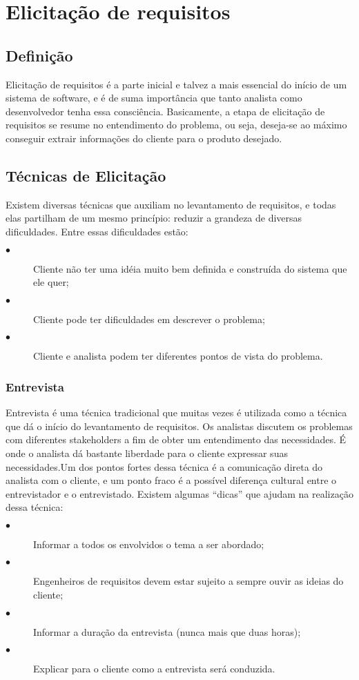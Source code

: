\chapter{Elicitação de requisitos}

\section{Definição}
  Elicitação de requisitos é a parte inicial e talvez a mais essencial do início de um sistema de software, e é de suma importância que tanto analista como desenvolvedor tenha essa consciência. Basicamente, a etapa de elicitação de requisitos se resume no entendimento do problema, ou seja, deseja-se ao máximo conseguir extrair informações do cliente para o produto desejado.
 \section{Técnicas de Elicitação}
 Existem diversas técnicas que auxiliam no levantamento de requisitos, e todas elas partilham de um mesmo princípio: reduzir a grandeza de diversas dificuldades. Entre essas dificuldades estão:
\begin{description}
\item[$\bullet$] Cliente não ter uma idéia muito bem definida e construída do sistema que ele quer;
\item[$\bullet$] Cliente pode ter dificuldades em descrever o problema;
\item[$\bullet$] Cliente e analista podem ter diferentes pontos de vista do problema.
\end{description}
\subsection{Entrevista}
Entrevista é uma técnica tradicional que muitas vezes é utilizada como a técnica que dá o início do levantamento de requisitos. Os analistas discutem os problemas com diferentes stakeholders a fim de obter um entendimento das necessidades. É onde o analista dá bastante liberdade para o cliente expressar suas necessidades.Um dos pontos fortes dessa técnica é a comunicação direta do analista com o cliente, e um ponto fraco é a possível diferença cultural entre o entrevistador e o entrevistado. Existem algumas “dicas” que ajudam na realização dessa técnica:
\begin{description}
\item[$\bullet$] Informar a todos os envolvidos o tema a ser abordado;
\item[$\bullet$] Engenheiros de requisitos devem estar sujeito a sempre ouvir as ideias do cliente;
\item[$\bullet$] Informar a duração da entrevista (nunca mais que duas horas);
\item[$\bullet$] Explicar para o cliente como a entrevista será conduzida.
\end{description}
